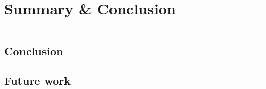 \documentclass[12pt]{report}
\begin{document}
\chapter{Summary \& Conclusion} \label{5}
\rule[10pt]{\linewidth}{3pt}
\section{Conclusion}
\section{Future work}



%
%
\clearpage
{}
\begin{thebibliography}{99}


\end{thebibliography}
\end{document}
